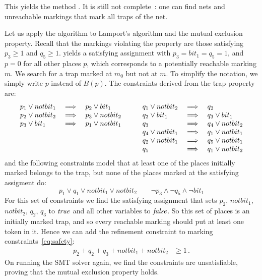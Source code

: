 This yields the method \safetyref{}.  It is still not
complete~\cite{EsparzaMelzer00}: one can find nets and unreachable markings that 
mark all traps of the net.

Let us apply the algorithm \safetyref{} to Lamport's algorithm and the
mutual exclusion property. 
Recall that the markings violating the property are those satisfying $ p_3 \geq 1$ and  $q_5 \geq 1$. \safety{} yields a
satisfying assignment with $p_3 = bit_1 = q_5 = 1$,
and $p=0$ for all other places $p$, 
which corresponds to a potentially reachable marking $m$. 
We search for a trap marked at $m_0$ but not at $m$. To simplify the
notation, we simply write $p$ instead of $B(p)$. The constraints derived from
the trap property are:
$$\begin{array}{l}
\begin{array}[t]{lcl}
  p_1 \lor notbit_1 &\implies& p_2 \lor    bit_1 \\
  p_2 \lor notbit_2 &\implies& p_3 \lor notbit_2 \\
  p_3 \lor    bit_1 &\implies& p_1 \lor notbit_1
\end{array} \qquad
\begin{array}[t]{lcl}
  q_1 \lor notbit_2 &\implies& q_2               \\
  q_2 \lor    bit_1 &\implies& q_3 \lor    bit_1 \\
  q_3               &\implies& q_4 \lor notbit_2 \\
  q_4 \lor notbit_1 &\implies& q_1 \lor notbit_1 \\
  q_2 \lor notbit_1 &\implies& q_5 \lor notbit_1 \\
  q_5               &\implies& q_1 \lor notbit_2
\end{array}
\end{array}
$$
and the following constraints model that at least one of the places 
initially marked belongs to the trap, but none of the places marked at 
the satisfying assigment do:
$$p_1 \lor q_1 \lor notbit_1 \lor notbit_2  \qquad \neg p_3 \land \neg q_5 \land
\neg bit_1$$ For this set of constraints we find the satisfying assignment 
that sets $p_2$, $notbit_1$, $notbit_2$, $q_2$, $q_3$ to $\operatorname{\mathit{true}}$ and all
other variables to $\operatorname{\mathit{false}}$. 
So this set of places is an initially marked trap, and 
so every reachable marking should put at least one token in it. 
Hence we can add the refinement constraint to marking
constraints~\eqref{eq:safety}:
\begin{align*}
  p_2 + q_2 + q_3 + notbit_1 + notbit_2 & \ge 1\,.
\end{align*}
%
On running the SMT solver again, we find the constraints are unsatisfiable, 
proving that the mutual exclusion property holds.



